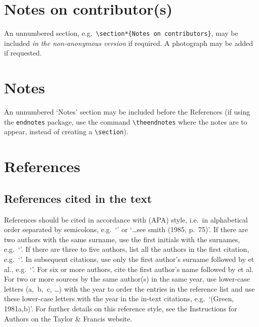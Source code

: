 \documentclass[]{interact}
\theoremstyle{plain}%
\theoremstyle{definition}
\theoremstyle{remark}
\begin{document}
\section*{Notes on contributor(s)}

An unnumbered section, e.g.\ \verb"\section*{Notes on contributors}", may be included \emph{in the non-anonymous version} if required. A photograph may be added if requested.


\section*{Notes}

An unnumbered `Notes' section may be included before the References (if using the \verb"endnotes" package, use the command \verb"\theendnotes" where the notes are to appear, instead of creating a \verb"\section").


\section{References}

\subsection{References cited in the text}

References should be cited in accordance with \citeauthor{APA10} (APA) style, i.e.\ in alphabetical order separated by semicolons, e.g.\ `\citep{Ban77,Pia88,Gre06}' or `\ldots see smith (1985, p.~75)'. If there are two authors with the same surname, use the first initials with the surnames, e.g.\ `\citep{Lig08,Lig06}'. If there are three to five authors, list all the authors in the first citation, e.g.\ `\citep{GssM91}'. In subsequent citations, use only the first author's surname followed by et al., e.g.\ `\citep{GssM91}'. For six or more authors, cite the first author's name followed by et al. For two or more sources by the same author(s) in the same year, use lower-case letters (a,~b,~c, \ldots) with the year to order the entries in the reference list and use these lower-case letters with the year in the in-text citations, e.g.\ `(Green, 1981a,b)'. For further details on this reference style, see the Instructions for Authors on the Taylor \& Francis website.
\end{document}
